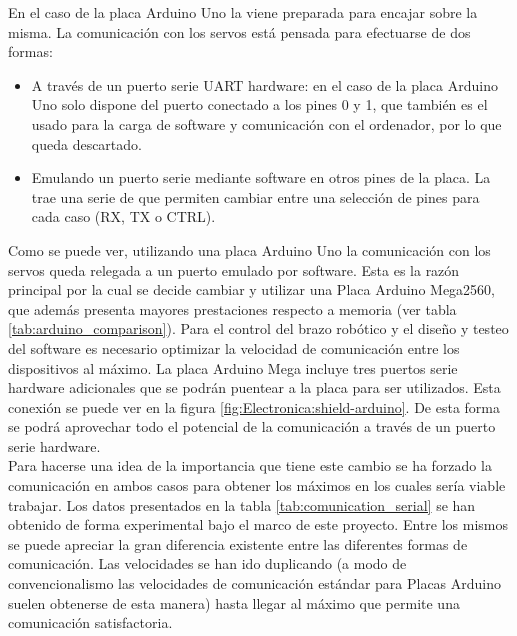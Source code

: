 	En el caso de la placa Arduino Uno la  viene preparada para encajar sobre la misma. La comunicación con los servos está pensada para efectuarse de dos formas:
	\begin{itemize}
		\item A través de un puerto serie UART hardware: en el caso de la placa Arduino Uno solo dispone del puerto conectado a los pines 0 y 1, que también es el usado para la carga de software y comunicación con el ordenador, por lo que queda descartado.
		\item Emulando un puerto serie mediante software en otros pines de la placa. La  trae una serie de   que permiten cambiar entre una selección de pines para cada caso (RX, TX o CTRL).
	\end{itemize}
	
	Como se puede ver, utilizando una placa Arduino Uno la comunicación con los servos queda relegada a un puerto emulado por software. Esta es la razón principal por la cual se decide cambiar y utilizar una Placa Arduino Mega2560, que además presenta mayores prestaciones respecto a memoria (ver tabla \ref{tab:arduino_comparison}). Para el control del brazo robótico y el diseño y testeo del software es necesario optimizar la velocidad de comunicación entre los dispositivos al máximo. La placa Arduino Mega incluye tres puertos serie hardware adicionales que se podrán puentear a la placa  para ser utilizados. Esta conexión se puede ver en la figura \ref{fig:Electronica:shield-arduino}. De esta forma se podrá aprovechar todo el potencial de la comunicación a través de un puerto serie hardware. 
	\\
	
	Para hacerse una idea de la importancia que tiene este cambio se ha forzado la comunicación en ambos casos para obtener los máximos en los cuales sería viable trabajar. Los datos presentados en la tabla \ref{tab:comunication_serial} se han obtenido de forma experimental bajo el marco de este proyecto. Entre los mismos se puede apreciar la gran diferencia existente entre las diferentes formas de comunicación. Las velocidades se han ido duplicando (a modo de convencionalismo las velocidades de comunicación estándar para Placas Arduino suelen obtenerse de esta manera) hasta llegar al máximo que permite una comunicación satisfactoria.
	
